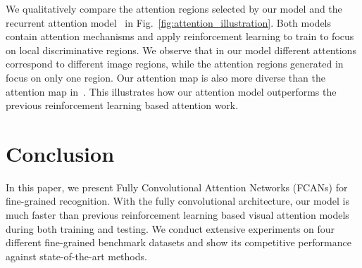 \documentclass[10pt,twocolumn,letterpaper]{article}
\begin{document}
We qualitatively compare the attention regions selected by our model and the recurrent attention model~\cite{sermanet2014attention} in Fig.~\ref{fig:attention_illustration}.
Both models contain attention mechanisms and apply reinforcement learning to train to focus on local discriminative regions.
We observe that in our model different attentions correspond to different image regions, while the attention regions generated in~\cite{sermanet2014attention} focus on only one region.
Our attention map is also more diverse than the attention map in~\cite{sermanet2014attention}.
This illustrates how our attention model outperforms the previous reinforcement learning based attention work.



\section{Conclusion}
In this paper, we present Fully Convolutional Attention Networks (FCANs) for fine-grained recognition.
With the fully convolutional architecture, our model is much faster than previous reinforcement learning based visual attention models during both training and testing.
We conduct extensive experiments on four different fine-grained benchmark datasets and show its competitive performance against state-of-the-art methods.


\small


%
\end{document}
